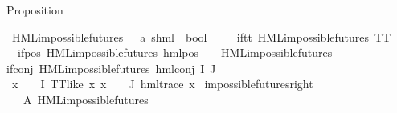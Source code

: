 \begin{isabellebody}
\begin{isamarkuptext}
Proposition%
\end{isamarkuptext}\isamarkuptrue%
\isamarkupfalse%
\ HML{\isacharunderscore}{\kern0pt}impossible{\isacharunderscore}{\kern0pt}futures\ {\isacharcolon}{\kern0pt}{\isacharcolon}{\kern0pt}\ \ {\isachardoublequoteopen}{\isacharparenleft}{\kern0pt}{\isacharprime}{\kern0pt}a{\isacharcomma}{\kern0pt}\ {\isacharprime}{\kern0pt}s{\isacharparenright}{\kern0pt}hml\ {\isasymRightarrow}\ bool{\isachardoublequoteclose}\isanewline
\ \ \isanewline
\ \ if{\isacharunderscore}{\kern0pt}tt{\isacharcolon}{\kern0pt}\ {\isachardoublequoteopen}HML{\isacharunderscore}{\kern0pt}impossible{\isacharunderscore}{\kern0pt}futures\ TT{\isachardoublequoteclose}\ {\isacharbar}{\kern0pt}\isanewline
\ \ if{\isacharunderscore}{\kern0pt}pos{\isacharcolon}{\kern0pt}\ {\isachardoublequoteopen}HML{\isacharunderscore}{\kern0pt}impossible{\isacharunderscore}{\kern0pt}futures\ {\isacharparenleft}{\kern0pt}hml{\isacharunderscore}{\kern0pt}pos\ {\isasymalpha}\ {\isasymphi}{\isacharparenright}{\kern0pt}{\isachardoublequoteclose}\ \ {\isachardoublequoteopen}HML{\isacharunderscore}{\kern0pt}impossible{\isacharunderscore}{\kern0pt}futures\ {\isasymphi}{\isachardoublequoteclose}\ {\isacharbar}{\kern0pt}\isanewline
if{\isacharunderscore}{\kern0pt}conj{\isacharcolon}{\kern0pt}\ {\isachardoublequoteopen}HML{\isacharunderscore}{\kern0pt}impossible{\isacharunderscore}{\kern0pt}futures\ {\isacharparenleft}{\kern0pt}hml{\isacharunderscore}{\kern0pt}conj\ I\ J\ {\isasymPhi}{\isacharparenright}{\kern0pt}{\isachardoublequoteclose}\isanewline
{}\ {\isachardoublequoteopen}{\isasymforall}x\ {\isasymin}\ {\isacharparenleft}{\kern0pt}{\isasymPhi}\ {\isacharbackquote}{\kern0pt}\ I{\isacharparenright}{\kern0pt}{\isachardot}{\kern0pt}\ TT{\isacharunderscore}{\kern0pt}like\ x{\isachardoublequoteclose}\ {\isachardoublequoteopen}{\isasymforall}x\ {\isasymin}\ {\isacharparenleft}{\kern0pt}{\isasymPhi}\ {\isacharbackquote}{\kern0pt}\ J{\isacharparenright}{\kern0pt}{\isachardot}{\kern0pt}\ {\isacharparenleft}{\kern0pt}hml{\isacharunderscore}{\kern0pt}trace\ x{\isacharparenright}{\kern0pt}{\isachardoublequoteclose}\isanewline
\isanewline
{}\isamarkupfalse%
\ impossible{\isacharunderscore}{\kern0pt}futures{\isacharunderscore}{\kern0pt}right{\isacharcolon}{\kern0pt}\isanewline
\ \ \ A{}{\isacharcolon}{\kern0pt}\ {\isachardoublequoteopen}HML{\isacharunderscore}{\kern0pt}impossible{\isacharunderscore}{\kern0pt}futures\ {\isasymphi}{\isachardoublequoteclose}\isanewline

\end{isabellebody}
